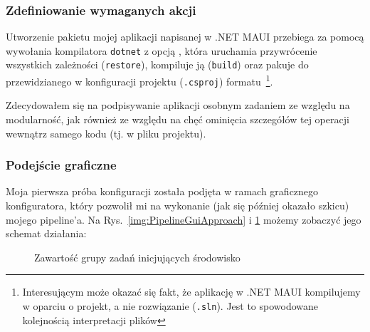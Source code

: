 \subsubsection{Zdefiniowanie wymaganych akcji}
Utworzenie pakietu mojej aplikacji napisanej w .NET MAUI przebiega za pomocą wywołania kompilatora 
\verb|dotnet| z opcją , 
która uruchamia przywrócenie wszystkich zależności (\verb|restore|), 
kompiluje ją (\verb|build|) oraz pakuje do przewidzianego w konfiguracji projektu (\verb|.csproj|) formatu~\cprotect\footnote{%
    Interesującym może okazać się fakt, że aplikację w .NET MAUI kompilujemy w oparciu o projekt, a nie rozwiązanie (\verb|.sln|).
    Jest to spowodowane kolejnością interpretacji plików
}.

Zdecydowałem się na podpisywanie aplikacji osobnym zadaniem ze względu na modularność,
jak również ze względu na chęć ominięcia szczegółów tej operacji wewnątrz samego kodu (tj. w pliku projektu).

\subsubsection{Podejście graficzne}
Moja pierwsza próba konfiguracji została podjęta w ramach graficznego konfiguratora, 
który pozwolił mi na wykonanie (jak się później okazało szkicu) mojego pipeline'a.
Na Rys.~\ref{img:PipelineGuiApproach} i \ref{img:taskGroupMauiPrepare} możemy zobaczyć jego schemat działania:

\begin{figure}[ht]
    \centering
    \begin{minipage}[t]{0.5\textwidth}
        \centering
        \caption{Grupa zadań inicjujących środowisko 
            (szczegóły na Rys.~\ref{img:taskGroupMauiPrepare}) 
            oraz publikacja i podpisanie cyfrowe}
        \label{img:PipelineGuiApproach}
    \end{minipage}
    \hfill
    \begin{minipage}[t]{0.47\textwidth}
        \centering
        \caption{Zawartość grupy zadań inicjujących środowisko}
        \label{img:taskGroupMauiPrepare}
    \end{minipage}
\end{figure}

\newpage

